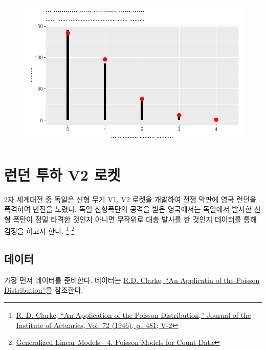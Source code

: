 \documentclass[
  letterpaper,
  chapter,a4paper,showtrims,openright,hidelinks]{oblivoir}
\begin{document}
\begin{figure}[H]

{\centering \includegraphics{cs_prussia_files/figure-pdf/unnamed-chunk-5-1.pdf}

}

\end{figure}

\hypertarget{v2-rocket}{%
\section{런던 투하 V2 로켓}\label{v2-rocket}}

2차 세계대전 중 독일은 신형 무기 V1, V2 로켓을 개발하여 전쟁 막판에 영국
런던을 폭격하여 반전을 노렸다. 독일 신형폭탄의 공격을 받은 영국에서는
독일에서 발사한 신형 폭탄이 정밀 타격한 것인지 아니면 무작위로 대충
발사를 한 것인지 데이터를 통해 검정을 하고자 한다. \footnote{\href{}{R.
  D. Clarke, ``An Application of the Poisson Distribution,'' Journal of
  the Institute of Actuaries, Vol. 72 (1946), p.~481; V-2}} \footnote{\href{http://data.princeton.edu/wws509/notes/c4s1.html}{Generalized
  Linear Models - 4. Poisson Models for Count Data}}

\hypertarget{v2-data}{%
\subsection{데이터}\label{v2-data}}

가장 먼저 데이터를 준비한다. 데이터는
\href{https://www.actuaries.org.uk/system/files/documents/pdf/0481.pdf}{R.D.
Clarke, ``An Applicatin of the Poisson Distribution''}을 참조한다.
\end{document}
